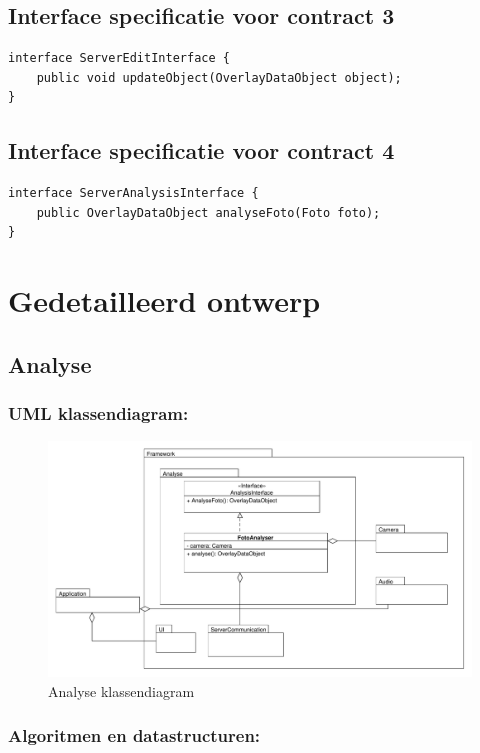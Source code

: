\documentclass[12pt,a4paper,oneside]{article}
\begin{document}
\subsection*{Interface specificatie voor contract 3}
\begin{lstlisting}
interface ServerEditInterface {
	public void updateObject(OverlayDataObject object);
}
\end{lstlisting}
\subsection*{Interface specificatie voor contract 4}
\begin{lstlisting}
interface ServerAnalysisInterface {
	public OverlayDataObject analyseFoto(Foto foto);
}
\end{lstlisting}
\section{Gedetailleerd ontwerp}
\subsection{Analyse}
\subsubsection*{UML klassendiagram:}
\begin{figure}[H]
  \begin{center}
    \includegraphics[scale=0.45]{Analyse.pdf}
    \caption{Analyse klassendiagram}
    \label{graph:graph2}
  \end{center}
\end{figure}
\subsubsection*{Algoritmen en datastructuren:}
\end{document}
